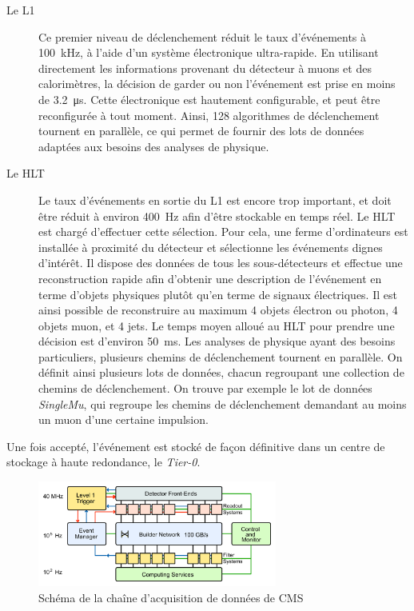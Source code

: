 \begin{description}
  \item[Le L1] Ce premier niveau de déclenchement réduit le taux d’événements à \SI{100}{\kHz}, à l'aide d'un système électronique ultra-rapide. En utilisant directement les informations provenant du détecteur à muons et des calorimètres, la décision de garder ou non l'événement est prise en moins de \SI{3.2}{\us}. Cette électronique est hautement configurable, et peut être reconfigurée à tout moment. Ainsi, 128 algorithmes de déclenchement tournent en parallèle, ce qui permet de fournir des lots de données adaptées aux besoins des analyses de physique.
  \item[Le HLT] Le taux d'événements en sortie du L1 est encore trop important, et doit être réduit à environ \SI{400}{\Hz} afin d'être stockable en temps réel. Le HLT est chargé d'effectuer cette sélection. Pour cela, une ferme d'ordinateurs est installée à proximité du détecteur et sélectionne les événements dignes d’intérêt. Il dispose des données de tous les sous-détecteurs et effectue une reconstruction rapide afin d'obtenir une description de l'événement en terme d'objets physiques plutôt qu'en terme de signaux électriques. Il est ainsi possible de reconstruire au maximum 4 objets électron ou photon, 4 objets muon, et 4 jets. Le temps moyen alloué au HLT pour prendre une décision est d'environ \SI{50}{\ms}. Les analyses de physique ayant des besoins particuliers, plusieurs chemins de déclenchement tournent en parallèle. On définit ainsi plusieurs lots de données, chacun regroupant une collection de chemins de déclenchement. On trouve par exemple le lot de données \emph{SingleMu}, qui regroupe les chemins de déclenchement demandant au moins un muon d'une certaine impulsion.
\end{description}

Une fois accepté, l'événement est stocké de façon définitive dans un centre de stockage à haute redondance, le \emph{Tier-0}.

\begin{figure}[tbp] \centering
  \includegraphics[width=0.7\textwidth]{chapitre2/figs/DAQ.pdf}
  \caption{Schéma de la chaîne d'acquisition de données de CMS}
  \label{fig:daq}
\end{figure}

